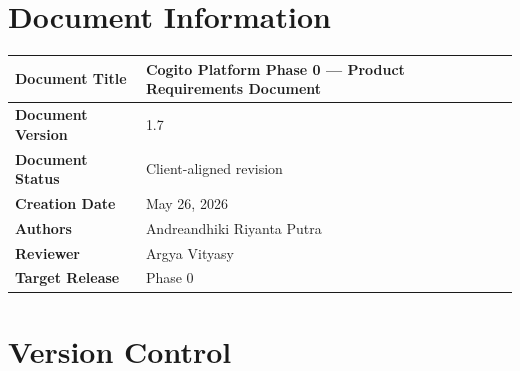 \documentclass[11pt,a4paper]{article}
\begin{document}
\tableofcontents
\newpage

\section{Document Information}

\begin{tabular}{|p{4.3cm}|p{10.2cm}|}
\hline
\textbf{Document Title} & Cogito Platform Phase 0 --- Product Requirements Document \\
\hline
\textbf{Document Version} & 1.7 \\
\hline
	\textbf{Document Status} & Client-aligned revision \\
\hline
\textbf{Creation Date} & May 26, 2026 \\
\hline
\textbf{Authors} & Andreandhiki Riyanta Putra \\
\hline
\textbf{Reviewer} & Argya Vityasy \\
\hline
\textbf{Target Release} & Phase 0 \\
\hline
\end{tabular}

\section{Version Control}
\end{document}
